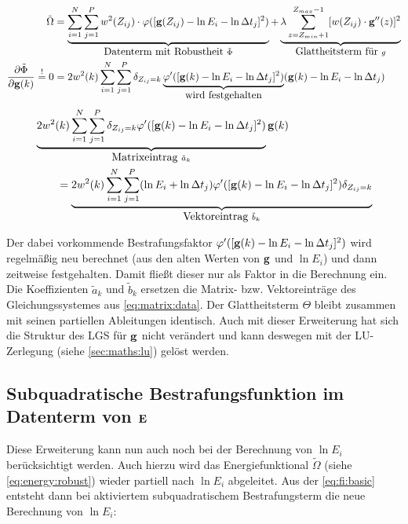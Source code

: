 \begin{align}
\label{eq:energy:robust}
\tilde{\Omega} &= 
    \underbrace{\sum_{i=1}^{N} \sum_{j=1}^{P} w^2(Z_{ij})
    \cdot \varphi([\mathbf g(Z_{ij}) - \ln E_i - \ln \Delta t_j]^2)}_{\mbox{Datenterm mit Robustheit }\tilde{\Phi}}
    + \underbrace{\lambda  \sum_{z=Z_{min}+1}^{Z_{max}-1} [w(Z_{ij}) \cdot \mathbf g''(z)]^2}_{\mbox{Glattheitsterm für }g}\\
\frac{\partial \tilde{\Phi}}{\partial \mathbf g(k)} \overset{!}{=} 0 &= 
    2 w^2(k) \sum_{i=1}^{N} \sum_{j=1}^{P}\delta_{Z_{ij}=k} 
    \underbrace{
        \varphi'(
            [\mathbf g(k)-\ln E_i - \ln \Delta t_j]^2
        )
    }_{\mbox{wird festgehalten}}
    (\mathbf g(k)-\ln E_i - \ln \Delta t_j)
\end{align}
\begin{align}
    &\underbrace{
        2w^2(k)\sum_{i=1}^{N} \sum_{j=1}^{P}  
            \delta_{Z_{ij}=k}
            \varphi'(
                [\mathbf g(k)-\ln E_i - \ln \Delta t_j]^2
            )
    }_{\mbox{Matrixeintrag } \tilde{a}_k}\mathbf g(k) \nonumber \\
    &\qquad= 
    \underbrace{
        2w^2(k)\sum_{i=1}^{N} \sum_{j=1}^{P} 
            (\ln E_i +\ln \Delta t_j)
            \varphi'(
                [\mathbf g(k)-\ln E_i - \ln \Delta t_j]^2
            )
            \delta_{Z_{ij}=k}
    }_{\mbox{Vektoreintrag }\tilde{b}_k}
\end{align}

Der dabei vorkommende Bestrafungsfaktor $\varphi'([\mathbf g(k)-\ln E_i - \ln \Delta t_j]^2)$ wird regelmäßig neu berechnet  (aus den alten Werten von $\mathbf g$ und $\ln E_i$) und dann zeitweise festgehalten. Damit fließt dieser nur als Faktor in die Berechnung ein. Die Koeffizienten $\tilde a_k$ und $\tilde b_k$ ersetzen die Matrix- bzw. Vektoreinträge des Gleichungssystemes aus \autoref{eq:matrix:data}. Der Glattheitsterm $\Theta$ bleibt zusammen mit seinen partiellen Ableitungen identisch. Auch mit dieser Erweiterung hat sich die Struktur des LGS für $\mathbf g$ nicht verändert und kann deswegen mit der LU-Zerlegung (siehe \autoref{sec:maths:lu}) gelöst werden. 




\subsection{Subquadratische Bestrafungsfunktion im Datenterm von $\mathbf E$}
\label{subsec:robust:e:daten}
Diese Erweiterung kann nun auch noch bei der Berechnung von $\ln E_i$ berücksichtigt werden. Auch hierzu wird das Energiefunktional $\tilde{\Omega}$ (siehe \autoref{eq:energy:robust}) wieder partiell nach $\ln E_i$ abgeleitet. Aus der \autoref{eq:fi:basic} entsteht dann bei aktiviertem subquadratischem Bestrafungsterm die neue Berechnung von $\ln E_i$:

